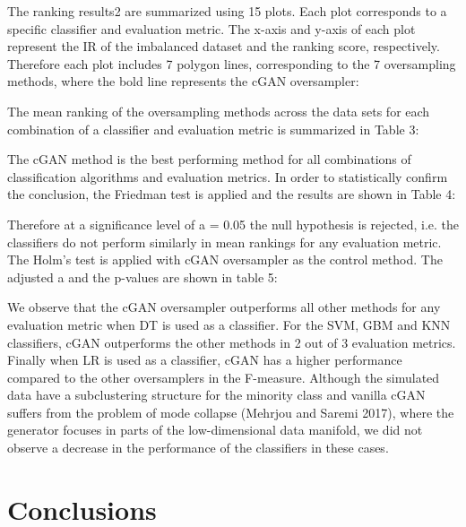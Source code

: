 \documentclass[parskip=full]{scrartcl}
\begin{document}
The ranking results2 are summarized using 15 plots. Each plot corresponds to a
specific classifier and evaluation metric. The x-axis and y-axis of each plot
represent the IR of the imbalanced dataset and the ranking score, respectively.
Therefore each plot includes 7 polygon lines, corresponding to the 7
oversampling methods, where the bold line represents the cGAN oversampler: 

The mean ranking of the oversampling methods across the data sets for each
combination of a classifier and evaluation metric is summarized in Table 3:

The cGAN method is the best performing method for all combinations of
classification algorithms and evaluation metrics. In order to statistically
confirm the conclusion, the Friedman test is applied and the results are shown
in Table 4:

Therefore at a significance level of a = 0.05 the null hypothesis is rejected,
i.e. the classifiers do not perform similarly in mean rankings for any
evaluation metric. The Holm’s test is applied with cGAN oversampler as the
control method. The adjusted a and the p-values are shown in table 5:

We observe that the cGAN oversampler outperforms all other methods for any
evaluation metric when DT is used as a classifier. For the SVM, GBM and KNN
classifiers, cGAN outperforms the other methods in 2 out of 3 evaluation
metrics. Finally when LR is used as a classifier, cGAN has a higher performance
compared to the other oversamplers in the F-measure. Although the simulated data
have a subclustering structure for the minority class and vanilla cGAN suffers
from the problem of mode collapse (Mehrjou and Saremi 2017), where the generator
focuses in parts of the low-dimensional data manifold, we did not observe a
decrease in the performance of the classifiers in these cases.

\section{Conclusions}
\end{document}
